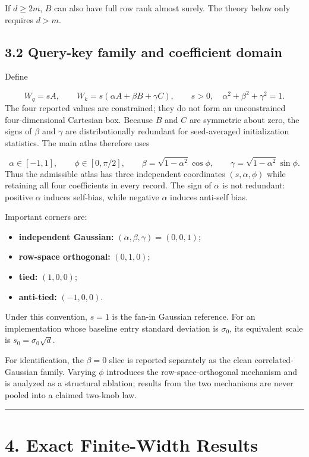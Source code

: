 \documentclass[11pt,letterpaper]{article}
\theoremstyle{definition}
\begin{document}
If $d\ge2m$, $B$ can also have full row rank almost surely. The theory below only requires $d>m$.

\subsection{3.2 Query-key family and coefficient domain}
Define

\[
W_q=sA,\qquad W_k=s(\alpha A+\beta B+\gamma C),
\qquad s>0,\quad \alpha^2+\beta^2+\gamma^2=1.
\]
The four reported values are constrained; they do not form an unconstrained four-dimensional Cartesian box. Because $B$ and $C$ are symmetric about zero, the signs of $\beta$ and $\gamma$ are distributionally redundant for seed-averaged initialization statistics. The main atlas therefore uses

\[
\alpha\in[-1,1],\qquad
\phi\in[0,\pi/2],\qquad
\beta=\sqrt{1-\alpha^2}\cos\phi,\qquad
\gamma=\sqrt{1-\alpha^2}\sin\phi.
\]
Thus the admissible atlas has three independent coordinates $(s,\alpha,\phi)$ while retaining all four coefficients in every record. The sign of $\alpha$ is not redundant: positive $\alpha$ induces self-bias, while negative $\alpha$ induces anti-self bias.

Important corners are:

\begin{itemize}
  \item \textbf{independent Gaussian:} $(\alpha,\beta,\gamma)=(0,0,1)$;
  \item \textbf{row-space orthogonal:} $(0,1,0)$;
  \item \textbf{tied:} $(1,0,0)$;
  \item \textbf{anti-tied:} $(-1,0,0)$.
\end{itemize}
Under this convention, $s=1$ is the fan-in Gaussian reference. For an implementation whose baseline entry standard deviation is $\sigma_0$, its equivalent scale is $s_0=\sigma_0\sqrt d$.

For identification, the $\beta=0$ slice is reported separately as the clean correlated-Gaussian family. Varying $\phi$ introduces the row-space-orthogonal mechanism and is analyzed as a structural ablation; results from the two mechanisms are never pooled into a claimed two-knob law.

\vspace{0.35em}\hrule\vspace{0.35em}
\section{4. Exact Finite-Width Results}
\end{document}
